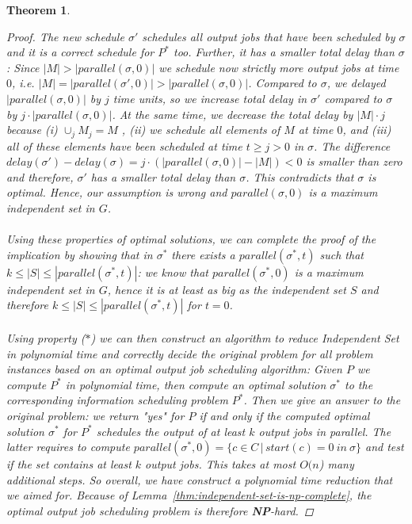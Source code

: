 \documentclass{article}
\newtheorem{mythm}{Theorem}
\begin{document}
\begin{mythm}
\begin{proof}
The new schedule $\sigma'$  schedules all output jobs that have been scheduled by $\sigma$ and it is a correct schedule for $P^*$ too. Further, it has a smaller total delay than $\sigma$:  Since  $|M| > |{parallel}(\sigma, 0)|$ we schedule now strictly more output jobs at time $0$, i.e.  $|M| = |{parallel}(\sigma', 0)| > |{parallel}(\sigma, 0)|$. Compared to $\sigma$, we delayed $|{parallel}(\sigma, 0)|$ by $j$ time units, so we increase total delay in $\sigma'$ compared to $\sigma$  by  $j \cdot |{parallel}(\sigma, 0)|$.  At the same time, we decrease the total delay by $|M| \cdot j$ because (i) $\cup_j M_j = M$ , (ii) we schedule all elements of $M$ at time $0$, and (iii) all of these elements have been scheduled at time $t \geq j > 0$ in $\sigma$. The difference ${delay}(\sigma') - {delay}(\sigma) = j \cdot ( |{parallel}(\sigma, 0)|  -  |M| ) < 0$ is smaller than zero and therefore, $\sigma'$ has a smaller total delay than $\sigma$.  This contradicts that $\sigma$ is optimal. Hence, our assumption is wrong and ${parallel}(\sigma, 0)$ is  a maximum independent set in $G$.

\paragraph{}

Using these properties of optimal solutions, we can complete the proof of the implication by showing that in $\sigma^*$ there exists a ${parallel}(\sigma^*,t)$  such that $k \leq |S| \leq |{parallel}(\sigma^*,t)|$: we know that ${parallel}(\sigma^*,0)$ is a maximum independent set in $G$, hence it is at least as big as the independent set $S$ and therefore $k \leq |S| \leq |{parallel}(\sigma^*,t)|$ for $t = 0$.

\paragraph{}
Using property ($\ast$)  we can then construct an algorithm to reduce {\sc Independent Set} in polynomial time and correctly decide the original problem for all problem instances based on an optimal output job scheduling algorithm: Given $P$ we compute $P^*$ in polynomial time, then compute an optimal solution $\sigma^*$ to the corresponding information scheduling problem $P^*$. Then we give an answer to the original problem: we return "yes" for $P$ if and only if the computed optimal solution $\sigma^*$ for $P^*$ schedules the output of at least $k$ output jobs in parallel. The latter requires to compute ${parallel}(\sigma^*,0) = \{  c \in C\,  |\,  {start}(c) = 0 \ in\  \sigma\}$ and test if the set contains at least $k$ output jobs. This takes at most $O(n$) many additional steps. So overall, we have construct a polynomial time reduction that we aimed for. Because of Lemma~\ref{thm:independent-set-is-np-complete}, the optimal output job scheduling problem is therefore {\bf NP}-hard.
\end{proof}
\end{mythm}
\end{document}
